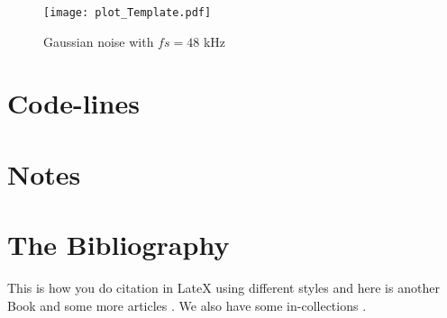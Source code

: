 \documentclass[11pt, a4paper]{article}
\begin{document}
\begin{figure}[H]
	\centering
	\texttt{[image: plot\_Template.pdf]}
	\caption{Gaussian noise with $fs = 48$ kHz}
	\label{fig:image1}
\end{figure}

\section{Code-lines}

\section{Notes}

\section{The Bibliography}

This is how you do citation in LateX using different styles \cite{holube2010development} and here is another Book \cite{yost2013hearing} and some more articles \cite{verhey1999within}. We also have some in-collections \cite{bitzer2001superdirective}.




\end{document}
